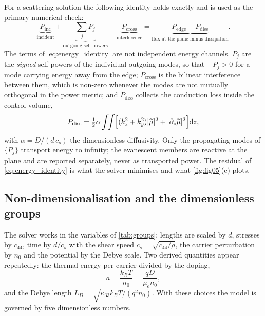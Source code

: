 For a scattering solution the following identity holds exactly and is used as
the primary numerical check:
\begin{equation}
\label{eq:energy_identity}
\underbrace{P_{\text{inc}}}_{\text{incident}}
+\underbrace{\sum_{j}P_j}_{\text{outgoing self-powers}}
+\underbrace{P_{\text{cross}}}_{\text{interference}}
=\underbrace{P_{\text{edge}}-P_{\text{diss}}}_{\text{flux at the plane minus dissipation}} .
\end{equation}
The terms of \eqref{eq:energy_identity} are not independent energy channels.
$P_j$ are the \emph{signed} self-powers of the individual outgoing modes, so
that $-P_j>0$ for a mode carrying energy away from the edge; $P_{\text{cross}}$
is the bilinear interference between them, which is non-zero whenever the
modes are not mutually orthogonal in the power metric; and $P_{\text{diss}}$
collects the conduction loss inside the control volume,
\begin{equation}
\label{eq:dissipation}
P_{\text{diss}}=\tfrac12\alpha\int\!\!\int
\Bigl[(k_x^2+k_y^2)|\widetilde\mu|^2+|\partial_z\widetilde\mu|^2\Bigr]\mathrm{d} z ,
\end{equation}
with $\alpha=D/(d\,c_s)$ the dimensionless diffusivity.  Only the propagating
modes of $\{P_j\}$ transport energy to infinity; the evanescent members are
reactive at the plane and are reported separately, never as transported power.
The residual of \eqref{eq:energy_identity} is what the solver minimises and
what \cref{fig:fig05}(c) plots.

\subsection{Non-dimensionalisation and the dimensionless groups}
\label{sec:governing_nondim}

The solver works in the variables of \cref{tab:groups}: lengths are scaled by
$d$, stresses by $c_{44}$, time by $d/c_s$ with the shear speed
$c_s=\sqrt{c_{44}/\rho}$, the carrier perturbation by $n_0$ and the potential by
the Debye scale.  Two derived quantities appear repeatedly: the thermal energy
per carrier divided by the doping,
\begin{equation}
\label{eq:a_scale}
a=\frac{k_BT}{n_0}=\frac{qD}{\mu_e n_0},
\end{equation}
and the Debye length $L_D=\sqrt{\kappa_{33}k_BT/(q^2n_0)}$.  With these
choices the model is governed by five dimensionless numbers.

